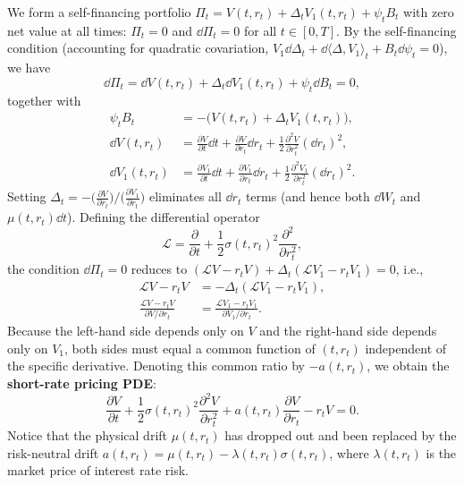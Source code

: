We form a self-financing portfolio $\Pi_t = V(t, r_t) + \Delta_t V_1(t, r_t) + \psi_t B_t$ with zero net value at all times: $\Pi_t = 0$ and $\dd\Pi_t = 0$ for all $t \in [0, T]$. By the self-financing condition (accounting for quadratic covariation, $V_1\dd\Delta_t + \dd\langle \Delta, V_1 \rangle_t + B_t\dd\psi_t = 0$), we have
\[
\dd\Pi_t = \dd V(t, r_t) + \Delta_t\dd V_1(t, r_t) + \psi_t\dd B_t = 0,
\]
together with
\begin{align*}
\psi_t B_t &= -\bigl(V(t, r_t) + \Delta_t V_1(t, r_t)\bigr), \\
\dd V(t, r_t) &= \frac{\partial V}{\partial t}\dd t + \frac{\partial V}{\partial r_t}\dd r_t + \frac{1}{2}\frac{\partial^2 V}{\partial r_t^2}(\dd r_t)^2, \\
\dd V_1(t, r_t) &= \frac{\partial V_1}{\partial t}\dd t + \frac{\partial V_1}{\partial r_t}\dd r_t + \frac{1}{2}\frac{\partial^2 V_1}{\partial r_t^2}(\dd r_t)^2.
\end{align*}
Setting $\Delta_t = -\bigl(\frac{\partial V}{\partial r_t}\bigr) / \bigl(\frac{\partial V_1}{\partial r_t}\bigr)$ eliminates all $\dd r_t$ terms (and hence both $\dd W_t$ and $\mu(t, r_t)\dd t$). Defining the differential operator
\[
\mathcal{L} = \frac{\partial}{\partial t} + \frac{1}{2}\sigma(t, r_t)^2 \frac{\partial^2}{\partial r_t^2},
\]
the condition $\dd\Pi_t = 0$ reduces to $(\mathcal{L}V - r_t V) + \Delta_t(\mathcal{L}V_1 - r_t V_1) = 0$, i.e.,
\begin{align*}
\mathcal{L}V - r_t V &= -\Delta_t(\mathcal{L}V_1 - r_t V_1), \\
\frac{\mathcal{L}V - r_t V}{\partial V / \partial r_t} &= \frac{\mathcal{L}V_1 - r_t V_1}{\partial V_1 / \partial r_t}.
\end{align*}
Because the left-hand side depends only on $V$ and the right-hand side depends only on $V_1$, both sides must equal a common function of $(t, r_t)$ independent of the specific derivative. Denoting this common ratio by $-a(t, r_t)$, we obtain the \textbf{short-rate pricing PDE}:
\begin{equation}\label{eq:short-rate-pde}
\frac{\partial V}{\partial t} + \frac{1}{2}\sigma(t, r_t)^2 \frac{\partial^2 V}{\partial r_t^2} + a(t, r_t)\frac{\partial V}{\partial r_t} - r_t V = 0.
\end{equation}
Notice that the physical drift $\mu(t, r_t)$ has dropped out and been replaced by the risk-neutral drift $a(t, r_t) = \mu(t, r_t) - \lambda(t, r_t)\sigma(t, r_t)$, where $\lambda(t, r_t)$ is the market price of interest rate risk.

